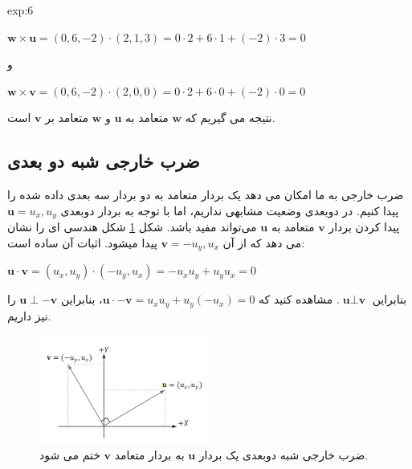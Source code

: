 {\begin{spacing}{1.5}
\begin{example}{exp:6}
            \begin{center}
                $\textbf{w}\times\textbf{u}=(0,6,-2)\cdot(2,1,3)=0\cdot 2+6\cdot 1+(-2)\cdot 3=0$

                و

                $\textbf{w}\times\textbf{v}=(0,6,-2)\cdot(2,0,0)=0\cdot 2+6\cdot 0+(-2)\cdot 0=0$
            \end{center}

            نتیجه می گیریم که $\textbf{w}$ متعامد به $\textbf{u}$ و $\textbf{w}$ متعامد بر $\textbf{v}$ است.
        \end{example}
    \end{spacing}
}

\subsection{\textbf{ضرب خارجی شبه دو بعدی}}
{
    \Large
    \begin{spacing}{1.5}
        ضرب خارجی به ما امکان می دهد یک بردار متعامد به دو بردار سه بعدی داده شده را پیدا کنیم.
        در دوبعدی وضعیت مشابهی نداریم،
        اما با توجه به بردار دوبعدی $\textbf{u}=u_{x},u_{y}$ پیدا کردن بردار $\textbf{v}$ متعامد به $\textbf{u}$ می‌تواند مفید باشد.
        شکل \ref{fig:4.Session.1.1.14} شکل هندسی ای را نشان می دهد که از آن $\textbf{v}=-u_{y},u_{x}$ پیدا میشود.
        اثبات آن ساده است:

        \begin{center}
            $\textbf{u}\cdot\textbf{v}=(u_{x},u_{y})\cdot(-u_{y},u_{x})=-u_{x}u_{y}+u_{y}u_{x}=0$
        \end{center}

        بنابراین $\textbf{u}\perp\textbf{v}$.
        مشاهده کنید که $\textbf{u}\cdot-\textbf{v}=u_{x}u_{y}+u_{y}(-u_{x})=0$، بنابراین $\textbf{u}\perp-\textbf{v}$ را نیز داریم.

        \begin{figure}[H]
            \centering
            \setlength{\belowcaptionskip}{-10pt}
            \includegraphics[width=0.5\textwidth]{Images/4/4.Session.1.1.14}
            \caption{ضرب خارجی شبه دوبعدی یک بردار $\textbf{u}$ به بردار متعامد $\textbf{v}$ ختم می شود.}
            \label{fig:4.Session.1.1.14}
        \end{figure}
    \end{spacing}
}


